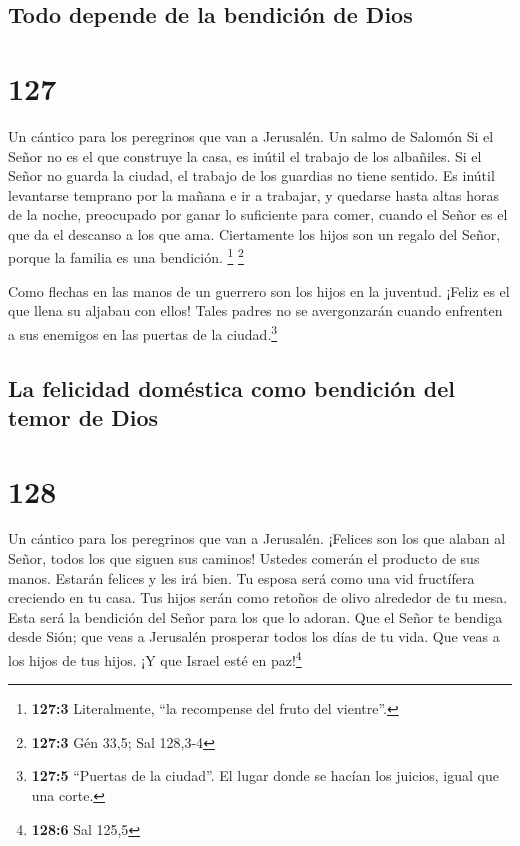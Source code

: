 \hypertarget{todo-depende-de-la-bendiciuxf3n-de-dios}{%
\subsection{Todo depende de la bendición de
Dios}\label{todo-depende-de-la-bendiciuxf3n-de-dios}}

\hypertarget{section-126}{%
\section{127}\label{section-126}}

Un cántico para los peregrinos que van a Jerusalén. Un salmo de Salomón
 Si el Señor no es el que construye la casa, es inútil el
trabajo de los albañiles. Si el Señor no guarda la ciudad, el trabajo de
los guardias no tiene sentido.  Es inútil levantarse
temprano por la mañana e ir a trabajar, y quedarse hasta altas horas de
la noche, preocupado por ganar lo suficiente para comer, cuando el Señor
es el que da el descanso a los que ama.  Ciertamente los
hijos son un regalo del Señor, porque la familia es una bendición.
\footnote{\textbf{127:3} Literalmente, ``la recompense del fruto del
  vientre''.} \footnote{\textbf{127:3} Gén 33,5; Sal 128,3-4}

 Como flechas en las manos de un guerrero son los hijos en
la juventud.  ¡Feliz es el que llena su aljabau con ellos!
Tales padres no se avergonzarán cuando enfrenten a sus enemigos en las
puertas de la ciudad.\footnote{\textbf{127:5} ``Puertas de la ciudad''.
  El lugar donde se hacían los juicios, igual que una corte.}

\hypertarget{la-felicidad-domuxe9stica-como-bendiciuxf3n-del-temor-de-dios}{%
\subsection{La felicidad doméstica como bendición del temor de
Dios}\label{la-felicidad-domuxe9stica-como-bendiciuxf3n-del-temor-de-dios}}

\hypertarget{section-127}{%
\section{128}\label{section-127}}

Un cántico para los peregrinos que van a Jerusalén. 
¡Felices son los que alaban al Señor, todos los que siguen sus caminos!
 Ustedes comerán el producto de sus manos. Estarán felices
y les irá bien.  Tu esposa será como una vid fructífera
creciendo en tu casa. Tus hijos serán como retoños de olivo alrededor de
tu mesa.  Esta será la bendición del Señor para los que lo
adoran.  Que el Señor te bendiga desde Sión; que veas a
Jerusalén prosperar todos los días de tu vida.  Que veas a
los hijos de tus hijos. ¡Y que Israel esté en paz!\footnote{\textbf{128:6}
  Sal 125,5}

